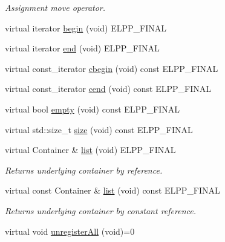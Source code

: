 \begin{DoxyCompactItemize}
\begin{DoxyCompactList}\small\item\em Assignment move operator. \end{DoxyCompactList}\item 
virtual iterator \hyperlink{classel_1_1base_1_1utils_1_1AbstractRegistry_a4ad971b1dddff996d327452d852e55b2}{begin} (void) E\-L\-P\-P\-\_\-\-F\-I\-N\-A\-L
\item 
virtual iterator \hyperlink{classel_1_1base_1_1utils_1_1AbstractRegistry_a67c40207c171f23ad50a71db819e84f9}{end} (void) E\-L\-P\-P\-\_\-\-F\-I\-N\-A\-L
\item 
virtual const\-\_\-iterator \hyperlink{classel_1_1base_1_1utils_1_1AbstractRegistry_a37f743184e808d7c0028e21e0d0898bb}{cbegin} (void) const E\-L\-P\-P\-\_\-\-F\-I\-N\-A\-L
\item 
virtual const\-\_\-iterator \hyperlink{classel_1_1base_1_1utils_1_1AbstractRegistry_ad3ee081b4b25c5d77f971f949bdb9158}{cend} (void) const E\-L\-P\-P\-\_\-\-F\-I\-N\-A\-L
\item 
virtual bool \hyperlink{classel_1_1base_1_1utils_1_1AbstractRegistry_a43ff6484b778c298416c482c07a4df3f}{empty} (void) const E\-L\-P\-P\-\_\-\-F\-I\-N\-A\-L
\item 
virtual std\-::size\-\_\-t \hyperlink{classel_1_1base_1_1utils_1_1AbstractRegistry_a58a7b8ea964bdf6008701dcfb6609ca5}{size} (void) const E\-L\-P\-P\-\_\-\-F\-I\-N\-A\-L
\item 
\hypertarget{classel_1_1base_1_1utils_1_1AbstractRegistry_a072859d3728a75f910c2898f62fd12da}{virtual Container \& \hyperlink{classel_1_1base_1_1utils_1_1AbstractRegistry_a072859d3728a75f910c2898f62fd12da}{list} (void) E\-L\-P\-P\-\_\-\-F\-I\-N\-A\-L}\label{classel_1_1base_1_1utils_1_1AbstractRegistry_a072859d3728a75f910c2898f62fd12da}

\begin{DoxyCompactList}\small\item\em Returns underlying container by reference. \end{DoxyCompactList}\item 
\hypertarget{classel_1_1base_1_1utils_1_1AbstractRegistry_a1c3da2af9177cbfae6f10b9e5dbe615c}{virtual const Container \& \hyperlink{classel_1_1base_1_1utils_1_1AbstractRegistry_a1c3da2af9177cbfae6f10b9e5dbe615c}{list} (void) const E\-L\-P\-P\-\_\-\-F\-I\-N\-A\-L}\label{classel_1_1base_1_1utils_1_1AbstractRegistry_a1c3da2af9177cbfae6f10b9e5dbe615c}

\begin{DoxyCompactList}\small\item\em Returns underlying container by constant reference. \end{DoxyCompactList}\item 
\hypertarget{classel_1_1base_1_1utils_1_1AbstractRegistry_a19223bc1fea48dbe6b47b4879aa4672f}{virtual void \hyperlink{classel_1_1base_1_1utils_1_1AbstractRegistry_a19223bc1fea48dbe6b47b4879aa4672f}{unregister\-All} (void)=0}\label{classel_1_1base_1_1utils_1_1AbstractRegistry_a19223bc1fea48dbe6b47b4879aa4672f}


\end{DoxyCompactItemize}
